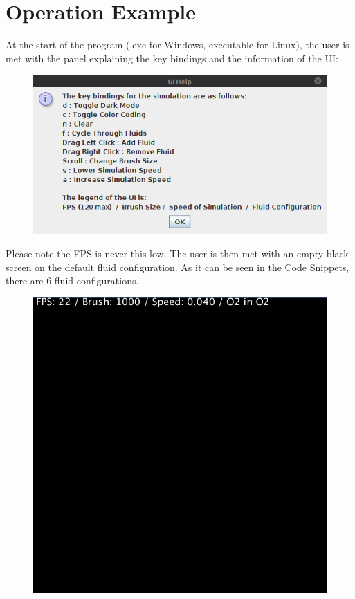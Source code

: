 \documentclass[12pt,a4paper]{book}
\begin{document}
\chapter{Operation Example}
At the start of the program (.exe for Windows, executable for Linux), the user is met with the panel explaining the key bindings and the information of the UI:

\begin{figure}[H]
	\includegraphics[scale=0.5]{pics/0.png}
\end{figure}

\pagebreak

Please note the FPS is never this low. The user is then met with an empty black screen on the default fluid configuration. As it can be seen in the Code Snippets, there are 6 fluid configurations.

\begin{figure}[H]
	\includegraphics[scale=0.5]{pics/blank.png}
\end{figure}
\end{document}
